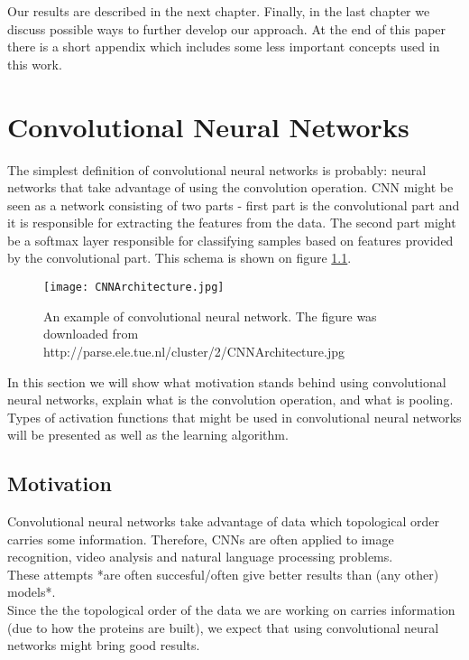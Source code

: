 \documentclass[a4paper,10pt]{report}
\begin{document}
    Our results are described in the next chapter. Finally, in the last chapter we discuss possible ways to further develop our approach. At the end of this paper there is a short appendix which includes some less important concepts used in this work.
    

  \chapter{Convolutional Neural Networks}
      The simplest definition of convolutional neural networks is probably: neural networks that take advantage of using the convolution operation. CNN might be seen as a network consisting of two parts - first part is the convolutional part and it is responsible for extracting the features from the data. The second part might be a softmax layer responsible for classifying samples based on features provided by the convolutional part. This schema is shown on figure \ref{fig:con_network}.\\
      
     \begin{figure}[h!]
	  \centering
	  \texttt{[image: CNNArchitecture.jpg]}
	  \caption{An example of convolutional neural network. The figure was downloaded from http://parse.ele.tue.nl/cluster/2/CNNArchitecture.jpg}
	  \label{fig:con_network}
	\end{figure} 
      
      In this section we will show what motivation stands behind using convolutional neural networks, explain what is the convolution operation, and what is pooling. Types of activation functions that might be used in convolutional neural networks
      will be presented as well as the learning algorithm.\\
      
      \section{Motivation}
	Convolutional neural networks take advantage of data which topological order carries some information. Therefore, CNNs are often applied to image recognition, video analysis and natural language processing problems.\\ %
	These attempts *are often succesful/often give better results than (any other) models*.\\ %
	Since the the topological order of the data we are working on carries information (due to how the proteins are built), we expect that using convolutional neural networks might bring good results.\\
	
\end{document}
